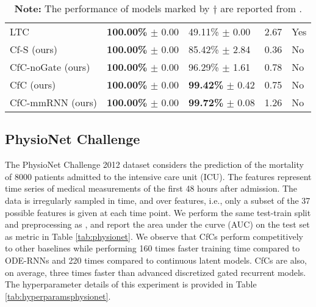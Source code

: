 \documentclass[12pt]{article}
\begin{document}
\begin{table}[t]
\begin{tabular}{lllll}
        LTC \cite{hasani2021liquid} & \textbf{100.00\%} $\pm$ 0.00 &  49.11\% $\pm$ 0.00 & 2.67 & Yes \\
        \cmidrule{1-5}
        Cf-S (ours) & \textbf{100.00\%} $\pm$ 0.00 &  85.42\% $\pm$ 2.84 & 0.36 & No \\
        CfC-noGate (ours) & \textbf{100.00\%} $\pm$ 0.00 & 96.29\% $\pm$ 1.61 & 0.78 & No \\
        CfC (ours) & \textbf{100.00\%} $\pm$ 0.00 & \textbf{99.42\%} $\pm$ 0.42 & 0.75 & No \\
        CfC-mmRNN (ours)  & \textbf{100.00\%} $\pm$ 0.00 & \textbf{99.72\%} $\pm$ 0.08 & 1.26 & No \\
        \bottomrule
    \end{tabular}
    \caption*{\footnotesize \textbf{Note:} The performance of models marked by $\dagger$ are reported from \cite{lechner2020learning}.}
    \label{tab:synthetic}
\end{table}



\subsection*{PhysioNet Challenge}
The PhysioNet Challenge 2012 dataset considers the prediction of the mortality of 8000 patients admitted to the intensive care unit (ICU). The features represent time series of medical measurements of the first 48 hours after admission. The data is irregularly sampled in time, and over features, i.e., only a subset of the 37 possible features is given at each time point.
We perform the same test-train split and preprocessing as \cite{rubanova2019latent}, and report the area under the curve (AUC) on the test set as metric in Table \ref{tab:physionet}. We observe that CfCs perform competitively to other baselines while performing 160 times faster training time compared to ODE-RNNs and 220 times compared to continuous latent models. CfCs are also, on average, three times faster than advanced discretized gated recurrent models. The hyperparameter details of this experiment is provided in Table \ref{tab:hyperparamsphysionet}. 
\end{document}
